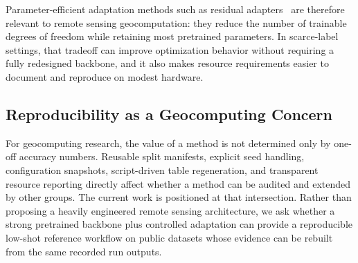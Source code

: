 Parameter-efficient adaptation methods such as residual adapters~\cite{houlsby2019adapter} are therefore relevant to remote sensing geocomputation: they reduce the number of trainable degrees of freedom while retaining most pretrained parameters. In scarce-label settings, that tradeoff can improve optimization behavior without requiring a fully redesigned backbone, and it also makes resource requirements easier to document and reproduce on modest hardware.

\subsection{Reproducibility as a Geocomputing Concern}

For geocomputing research, the value of a method is not determined only by one-off accuracy numbers. Reusable split manifests, explicit seed handling, configuration snapshots, script-driven table regeneration, and transparent resource reporting directly affect whether a method can be audited and extended by other groups. The current work is positioned at that intersection. Rather than proposing a heavily engineered remote sensing architecture, we ask whether a strong pretrained backbone plus controlled adaptation can provide a reproducible low-shot reference workflow on public datasets whose evidence can be rebuilt from the same recorded run outputs.
